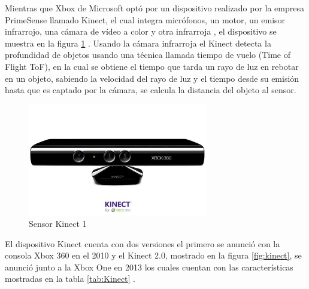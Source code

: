 Mientras que Xbox de Microsoft optó por un dispositivo realizado por la empresa PrimeSense llamado Kinect, el cual integra micrófonos, un motor, un emisor infrarrojo, una cámara de vídeo a color y otra infrarroja \cite{UsodelKi56:online}, el dispositivo se muestra en la figura \ref{fig:kinect1} \cite{Microsof29:online}. Usando la cámara infrarroja el Kinect detecta la profundidad de objetos usando una técnica llamada tiempo de vuelo (Time of Flight ToF), en la cual se obtiene el tiempo que tarda un rayo de luz en rebotar en un objeto, sabiendo la velocidad del rayo de luz y el tiempo desde su emisión hasta que es captado por la cámara, se calcula la distancia del objeto al sensor\cite{Lachat2015}.\\

\begin{figure}[!htb]
	\centering
	\includegraphics[width=0.7\textwidth]{01Introduccion/imagenes/xbox360kinect.JPG}
	\caption{Sensor Kinect 1} 
	\label{fig:kinect1}
\end{figure}

El dispositivo Kinect cuenta con dos versiones el primero se anunció con la consola Xbox 360 en el 2010 y el Kinect 2.0, mostrado en la figura \ref{fig:kinect}, se anunció junto a la Xbox One en 2013 los cuales cuentan con las características mostradas en la tabla \ref{tab:Kinect} \cite{UsodelKi56:online}.\\

